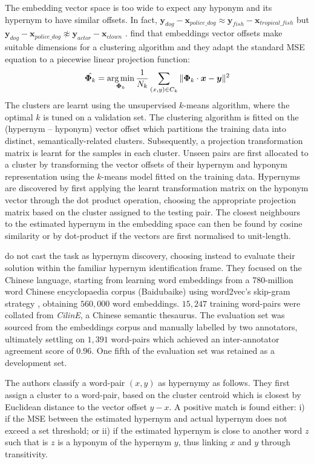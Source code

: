 The embedding vector space is too wide to expect any hyponym and its hypernym to have similar offsets.  In fact, $\bm{y}_{dog} - \bm{x}_{police\_dog} \approx \bm{y}_{fish} - \bm{x}_{tropical\_fish}$ but $\bm{y}_{dog} - \bm{x}_{police\_dog} \not \approx \bm{y}_{actor} - \bm{x}_{clown}$ \citep{Fu2014}.  \citeauthor{Fu2014} find that embeddings vector offsets make suitable dimensions for a clustering algorithm and they adapt the standard \ac{MSE} equation to a piecewise linear projection function:
\[\hat{\bm{\Phi}_k} = \operatorname*{arg\,min}_{\bm{\Phi}_k} \frac{1}{N_k} \sum_{(x,y) \in C_k} \Vert \bm{\Phi}_k \cdot \bm{x} - \bm {y} \Vert^2 \]
The clusters are learnt using the unsupervised $k$-means algorithm, where the optimal $k$ is tuned on a validation set.  The clustering algorithm is fitted on the (hypernym – hyponym) vector offset which partitions the training data into distinct, semantically-related clusters.  Subsequently, a projection transformation matrix is learnt for the samples in each cluster.  Unseen pairs are first allocated to a cluster by transforming the vector offsets of their hypernym and hyponym representation using the $k$-means model fitted on the training data.  Hypernyms are discovered by first applying the learnt transformation matrix on the hyponym vector through the dot product operation, choosing the appropriate projection matrix based on the cluster assigned to the testing pair.  The closest neighbours to the estimated hypernym in the embedding space can then be found by cosine similarity or by dot-product if the vectors are first normalised to unit-length.

\citeauthor{Fu2014} do not cast the task as hypernym discovery, choosing instead to evaluate their solution within the familiar hypernym identification frame.  They focused on the Chinese language, starting from learning word embeddings from a 780-million word Chinese encyclopaedia corpus (Baidubaike) using word2vec’s skip-gram strategy \citep{mikolov2013efficient}, obtaining $560,000$ word embeddings.  $15,247$ training word-pairs were collated from \textit{CilinE}, a Chinese semantic thesaurus.  The evaluation set was sourced from the embeddings corpus and manually labelled by two annotators, ultimately settling on $1,391$ word-pairs which achieved an inter-annotator agreement score of 0.96.  One fifth of the evaluation set was retained as a development set.

The authors classify a word-pair $(x, y)$ as hypernymy as follows. They first assign a cluster to a word-pair, based on the cluster centroid which is closest by Euclidean distance to the vector offset $y - x$.  A positive match is found either: i) if the \ac{MSE} between the estimated hypernym and actual hypernym does not exceed a set threshold; or ii) if the estimated hypernym is close to another word $z$ such that is $z$ is a hyponym of the hypernym $y$, thus linking $x$ and $y$ through transitivity.

